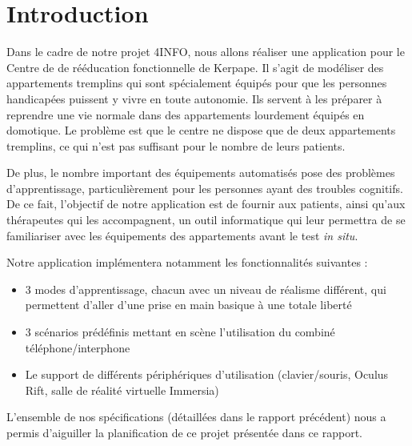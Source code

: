 \section{Introduction}
Dans le cadre de notre projet 4INFO, nous allons réaliser une application pour le Centre de de rééducation fonctionnelle de Kerpape. Il s'agit de modéliser des appartements tremplins qui sont spécialement équipés pour que les personnes handicapées puissent y vivre en toute autonomie. Ils servent à les préparer à reprendre une vie normale dans des appartements lourdement équipés en domotique. Le problème est que le centre ne dispose que de deux appartements tremplins, ce qui n'est pas suffisant pour le nombre de leurs patients.\newline

De plus, le nombre important des équipements automatisés pose des problèmes d'apprentissage, particulièrement pour les personnes ayant des troubles cognitifs. De ce fait, l'objectif de notre application est de fournir aux patients, ainsi qu'aux thérapeutes qui les accompagnent, un outil informatique qui leur permettra de se familiariser avec les équipements des appartements avant le test \textit{in situ}. \newline

Notre application implémentera notamment les fonctionnalités suivantes :
\begin{itemize}
	\item 3 modes d'apprentissage, chacun avec un niveau de réalisme différent, qui permettent d'aller d'une prise en main basique à une totale liberté
	\item 3 scénarios prédéfinis mettant en scène l'utilisation du combiné téléphone/interphone
 	\item Le support de différents périphériques d'utilisation (clavier/souris, Oculus Rift, salle de réalité virtuelle Immersia)
\end{itemize}
\vspace{0.5cm}
\hspace{0.5cm}L'ensemble de nos spécifications (détaillées dans le rapport précédent) nous a permis d'aiguiller la planification de ce projet présentée dans ce rapport.